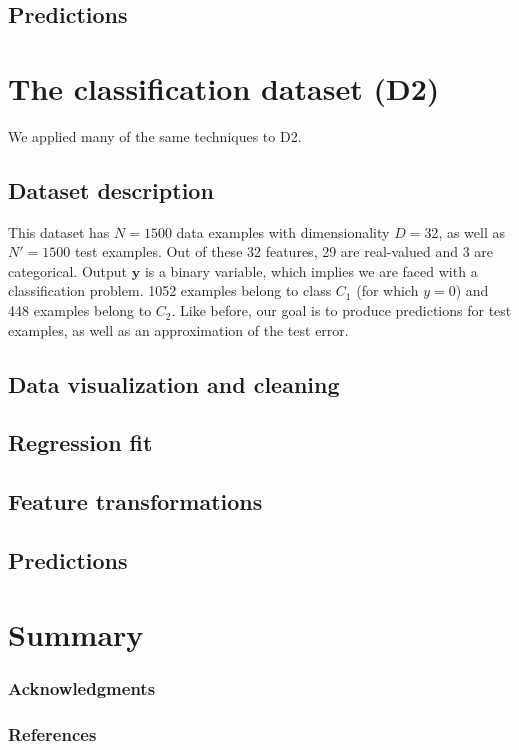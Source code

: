 \documentclass{article} %
\begin{document}
  \subsection{Predictions}



\section{The classification dataset (D2)}
  We applied many of the same techniques to D2.

  \subsection{Dataset description}
  This dataset has $N = 1500$ data examples with dimensionality $D = 32$, as well as $N' = 1500$ test examples. Out of these 32 features, 29 are real-valued and 3 are categorical. Output $\mathbf{y}$ is a binary variable, which implies we are faced with a classification problem. 1052 examples belong to class $C_1$ (for which $y = 0$) and 448 examples belong to $C_2$. Like before, our goal is to produce predictions for test examples, as well as an approximation of the test error.

  \subsection{Data visualization and cleaning}

  \subsection{Regression fit}

  \subsection{Feature transformations}

  \subsection{Predictions}



\section{Summary}

\subsubsection*{Acknowledgments}

\subsubsection*{References}
\end{document}
